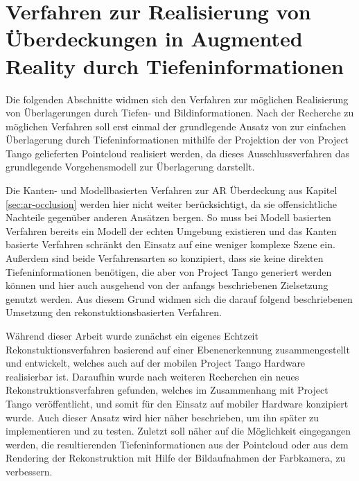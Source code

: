 \chapter{Verfahren zur Realisierung von Überdeckungen in Augmented Reality durch Tiefen\-informationen} \label{sec:optimization}


Die folgenden Abschnitte widmen sich den Verfahren zur möglichen Realisierung von Überlagerungen durch Tiefen- und Bildinformationen. Nach der Recherche zu möglichen Verfahren soll erst einmal der grundlegende Ansatz von \citet{wloka1995resolving} zur einfachen Überlagerung durch Tiefeninformationen mithilfe der Projektion der von Project Tango gelieferten Pointcloud realisiert werden, da dieses Ausschlussverfahren das grundlegende Vorgehensmodell zur Überlagerung darstellt. 

Die Kanten- und Modellbasierten Verfahren zur AR Überdeckung aus Kapitel \ref{sec:ar-occlusion} werden hier nicht weiter berücksichtigt, da sie offensichtliche Nachteile gegenüber anderen Ansätzen bergen. So muss bei Modell basierten Verfahren bereits ein Modell der echten Umgebung existieren und das Kanten basierte Verfahren schränkt den Einsatz auf eine weniger komplexe Szene ein. Außerdem sind beide Verfahrensarten so konzipiert, dass sie keine direkten Tiefeninformationen benötigen, die aber von Project Tango generiert werden können und hier auch ausgehend von der anfangs beschriebenen Zielsetzung genutzt werden. Aus diesem Grund widmen sich die darauf folgend beschriebenen Umsetzung den rekonstuktionsbasierten Verfahren.

Während dieser Arbeit wurde zunächst ein eigenes Echtzeit Rekonstuktionsverfahren basierend auf einer Ebenenerkennung zusammengestellt und entwickelt, welches auch auf der mobilen Project Tango Hardware realisierbar ist. Daraufhin wurde nach weiteren Recherchen ein neues Rekonstruktionsverfahren gefunden, welches im Zusammenhang mit Project Tango veröffentlicht, und somit für den Einsatz auf mobiler Hardware konzipiert wurde. Auch dieser Ansatz wird hier näher beschrieben, um ihn später zu implementieren und zu testen. Zuletzt soll näher auf die Möglichkeit eingegangen werden, die resultierenden Tiefeninformationen aus der Pointcloud oder aus dem Rendering der Rekonstruktion mit Hilfe der Bildaufnahmen der Farbkamera, zu verbessern. 









